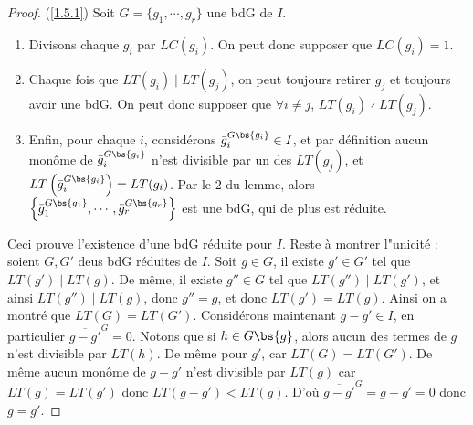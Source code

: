         \begin{proof} (\ref{1.5.1})
            Soit $G = \{g_1, \cdots, g_r\}$ une bdG de $I$.
            \begin{enumerate}
                \item Divisons chaque $g_i$ par $LC(g_i)$. On peut donc supposer que $LC(g_i) = 1$.
                \item Chaque fois que $LT(g_i) \mid LT(g_j)$, on peut toujours retirer $g_j$ et toujours avoir une bdG. On peut donc supposer que $\forall i \neq j$, $LT(g_i) \nmid LT(g_j)$.
                \item Enfin, pour chaque $i$, considérons $\bar g_i^{G \bs \{g_i\}} \in I$, et par définition aucun monôme de $\bar g_i^{G \bs \{g_i\}}$ n'est divisible par un des $LT(g_j)$, et $LT\left(\bar g_i^{G \bs \{g_i\}}\right) = LT(g_i)$. Par le $2$ du lemme, alors $\left\{ \bar g_1^{G \bs \{g_1\}}, \cdots, \bar g_r^{G \bs \{g_r\}} \right\}$ est une bdG, qui de plus est réduite.
            \end{enumerate}
            Ceci prouve l'existence d'une bdG réduite pour $I$. Reste à montrer l"unicité : soient $G,G'$ deus bdG réduites de $I$. Soit $g \in G$, il existe $g' \in G'$ tel que $LT(g') \mid LT(g)$. De même, il existe $g'' \in G$ tel que $LT(g'') \mid LT(g')$, et ainsi $LT(g'') \mid LT(g)$, donc $g'' = g$, et donc $LT(g') = LT(g)$. Ainsi on a montré que $LT(G) = LT(G')$. Considérons maintenant $g - g' \in I$, en particulier $\overline{g - g'}^G = 0$. Notons que si $h \in G \bs \{g\}$, alors aucun des termes de $g$ n'est divisible par $LT(h)$. De même pour $g'$, car $LT(G) = LT(G')$. De même aucun monôme de $g - g'$ n'est divisible par $LT(g)$ car $LT(g) = LT(g')$ donc $LT(g - g') < LT(g)$. D'où $\overline{g - g'}^G = g- g' = 0$ donc $g = g'$.
        \end{proof}
